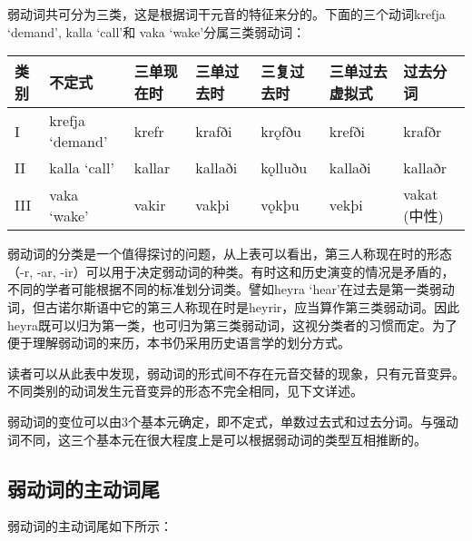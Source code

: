 弱动词共可分为三类，这是根据词干元音的特征来分的。下面的三个动词krefja
`demand‌', kalla `call‌'和 vaka `wake‌'分属三类弱动词：

\begin{longtable}{lllllll}
  \toprule
  类别  & 不定式             & 三单现在时  & 三单过去时   & 三复过去时   & 三单过去虚拟式 & 过去分词       \\
  \midrule
  \endhead
  \bottomrule
  \endfoot
  I   & krefja `demand‌' & krefr  & krafði  & krǫfðu  & krefði  & krafðr     \\
  II  & kalla `call‌'    & kallar & kallaði & kǫlluðu & kallaði & kallaðr    \\
  III & vaka `wake‌'     & vakir  & vakþi   & vǫkþu   & vekþi   & vakat (中性) \\
\end{longtable}

弱动词的分类是一个值得探讨的问题，从上表可以看出，第三人称现在时的形态（-r,
-ar,
-ir）可以用于决定弱动词的种类。有时这和历史演变的情况是矛盾的，不同的学者可能根据不同的标准划分词类。譬如heyra
`hear‌'在过去是第一类弱动词，但古诺尔斯语中它的第三人称现在时是heyrir，应当算作第三类弱动词。因此heyra既可以归为第一类，也可归为第三类弱动词，这视分类者的习惯而定。为了便于理解弱动词的来历，本书仍采用历史语言学的划分方式。

读者可以从此表中发现，弱动词的形式间不存在元音交替的现象，只有元音变异。不同类别的动词发生元音变异的形态不完全相同，见下文详述。

弱动词的变位可以由3个基本元确定，即不定式，单数过去式和过去分词。与强动词不同，这三个基本元在很大程度上是可以根据弱动词的类型互相推断的。

\subsection{弱动词的主动词尾}\label{弱动词的主动词尾}

弱动词的主动词尾如下所示：

